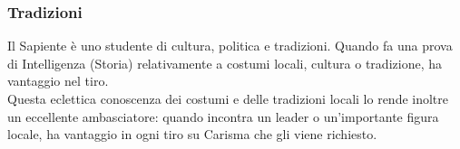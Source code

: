 \subsubsection{Tradizioni}
Il Sapiente è uno studente di cultura, politica e tradizioni. Quando fa una prova di  Intelligenza (Storia) relativamente a costumi locali, cultura o tradizione, ha vantaggio nel tiro. \\
Questa eclettica conoscenza dei costumi e delle tradizioni locali lo rende inoltre un eccellente ambasciatore: quando incontra un leader o un'importante figura locale, ha vantaggio in ogni tiro su Carisma che gli viene richiesto.